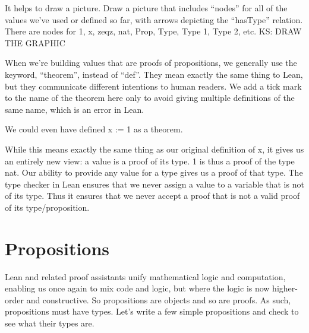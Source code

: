 \documentclass[letterpaper,10pt,english]{sphinxmanual}
\begin{document}
\begin{sphinxVerbatim}[commandchars=\\\{\}]
 
\end{sphinxVerbatim}

It helps to draw a picture. Draw a picture that includes “nodes” for
all of the values we’ve used or defined so far, with arrows depicting
the “hasType” relation. There are nodes for 1, x, zeqz, nat, Prop,
Type, Type 1, Type 2, etc. KS: DRAW THE GRAPHIC

When we’re building values that are proofs of propositions, we
generally use the keyword, “theorem”, instead of “def”. They mean
exactly the same thing to Lean, but they communicate different
intentions to human readers. We add a tick mark to the name of the
theorem here only to avoid giving multiple definitions of the same
name, which is an error in Lean.

\begin{sphinxVerbatim}[commandchars=\\\{\}]
      
\end{sphinxVerbatim}

We could even have defined x := 1 as a theorem.

\begin{sphinxVerbatim}[commandchars=\\\{\}]
    
\end{sphinxVerbatim}

While this means exactly the same thing as our original definition of
x, it gives us an entirely new view: a value is a proof of its type. 1
is thus a proof of the type nat. Our ability to provide any value for
a type gives us a proof of that type. The type checker in Lean ensures
that we never assign a value to a variable that is not of its
type. Thus it ensures that we never accept a proof that is not a valid
proof of its type/proposition.


\section{Propositions}
\label{\detokenize{15-proofs:propositions}}
Lean and related proof assistants unify mathematical logic and
computation, enabling us once again to mix code and logic, but where
the logic is now higher-order and constructive. So propositions are
objects and so are proofs. As such, propositions must have types. Let’s
write a few simple propositions and check to see what their types are.
\end{document}
